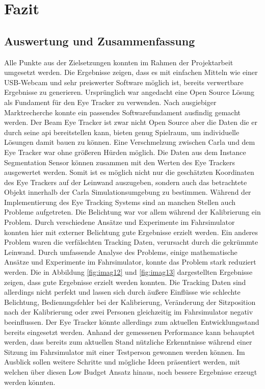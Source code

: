 \section{Fazit}
\subsection{Auswertung und Zusammenfassung}

Alle Punkte aus der Zielsetzungen konnten im Rahmen der Projektarbeit umgesetzt werden. Die Ergebnisse zeigen, dass es mit einfachen Mitteln wie einer USB-Webcam und sehr preiswerter Software möglich ist, bereits verwertbare Ergebnisse zu generieren. Ursprünglich war angedacht eine Open Source Lösung als Fundament für den Eye Tracker zu verwenden. Nach ausgiebiger Marktrecherche konnte ein passendes Softwarefundament ausfindig gemacht werden. Der Beam Eye Tracker ist zwar nicht Open Source aber die Daten die er durch seine \acrshort{api} bereitstellen kann, bieten genug Spielraum, um individuelle Lösungen damit bauen zu können. Eine Verschmelzung zwischen Carla und dem Eye Tracker war ohne größeren Hürden möglich. Die Daten aus dem Instance Segmentation Sensor können zusammen mit den Werten des Eye Trackers ausgewertet werden. Somit ist es möglich nicht nur die geschätzten Koordinaten des Eye Trackers auf der Leinwand auszugeben, sondern auch das betrachtete Objekt innerhalb der Carla Simulationsumgebung zu bestimmen.
Während der Implementierung des Eye Tracking Systems sind an manchen Stellen auch Probleme aufgetreten. Die Belichtung war vor allem während der Kalibrierung ein Problem. Durch verschiedene Ansätze und Experimente im Fahrsimulator konnten hier mit externer Belichtung gute Ergebnisse erzielt werden.
Ein anderes Problem waren die verfälschten Tracking Daten, verursacht durch die gekrümmte Leinwand. Durch umfassende Analyse des Problems, einige mathematische Ansätze und Experimente im Fahrsimulator, konnte das Problem stark reduziert werden. Die in Abbildung \ref{fig:imag12} und \ref{fig:imag13} dargestellten Ergebnisse zeigen, dass gute Ergebnisse erzielt werden konnten. 
Die Tracking Daten sind allerdings nicht perfekt und lassen sich durch äußere Einflüsse wie schlechte Belichtung, Bedienungsfehler bei der Kalibrierung, Veränderung der Sitzposition nach der Kalibrierung oder zwei Personen gleichzeitig im Fahrsimulator negativ beeinflussen. Der Eye Tracker könnte allerdings zum aktuellen Entwicklungsstand bereits eingesetzt werden. Anhand der gemessenen Performance kann behauptet werden, dass bereits zum aktuellen Stand nützliche Erkenntnisse während einer Sitzung im Fahrsimulator mit einer Testperson gewonnen werden können. Im Ausblick sollen weitere Schritte und mögliche Ideen präsentiert werden, mit welchen über diesen Low Budget Ansatz hinaus, noch bessere Ergebnisse erzeugt werden könnten.


